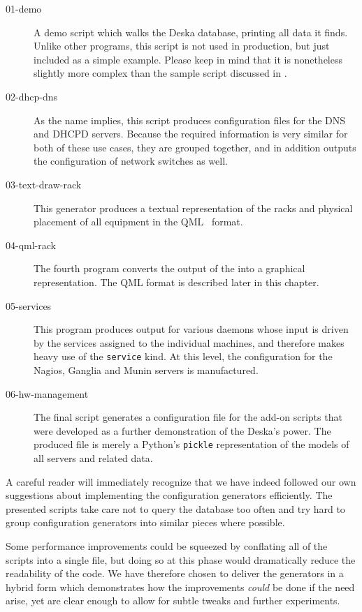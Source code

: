 \documentclass[deska]{subfiles}
\begin{document}
\begin{description}
    \item[01-demo] A demo script which walks the Deska database, printing all data it finds.  Unlike other programs,
        this script is not used in production, but just included as a simple example.  Please keep in mind that it is
        nonetheless slightly more complex than the sample script discussed in .
    \item[02-dhcp-dns] As the name implies, this script produces configuration files for the DNS and DHCPD servers.
        Because the required information is very similar for both of these use cases, they are grouped together, and in
        addition outputs the configuration of network switches as well.
    \item[03-text-draw-rack] This generator produces a textual representation of the racks and physical placement of all
        equipment in the QML~\cite{qml} format.
    \item[04-qml-rack] The fourth program converts the output of the  into a graphical
        representation.  The QML format is described later in this chapter.
    \item[05-services] This program produces output for various daemons whose input is driven by the services assigned
        to the individual machines, and therefore makes heavy use of the {\tt service} kind.  At this level, the
        configuration for the Nagios, Ganglia and Munin servers is manufactured.
    \item[06-hw-management] The final script generates a configuration file for the add-on scripts that were developed
        as a further demonstration of the Deska's power.  The produced file is merely a Python's {\tt pickle}
        representation of the models of all servers and related data.
\end{description}

A careful reader will immediately recognize that we have indeed followed our own suggestions about implementing the
configuration generators efficiently.  The presented scripts take care not to query the database too often and try hard
to group configuration generators into similar pieces where possible.

Some performance improvements could be squeezed by conflating all of the scripts into a single file, but doing so at
this phase would dramatically reduce the readability of the code.  We have therefore chosen to deliver the generators in
a hybrid form which demonstrates how the improvements {\em could} be done if the need arise, yet are clear enough to
allow for subtle tweaks and further experiments.
\end{document}
